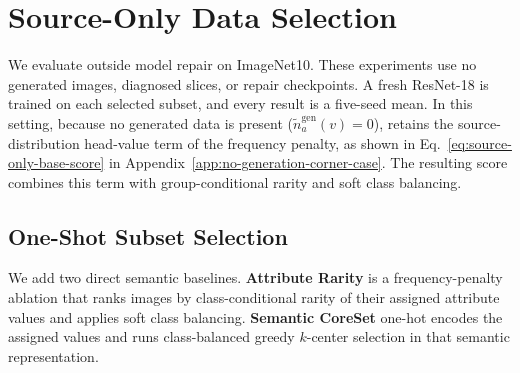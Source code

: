 \section{Source-Only Data Selection}
\label{app:source-only-selection}

We evaluate \model outside model repair on ImageNet10. These experiments use no generated images, diagnosed slices, or repair checkpoints. A fresh ResNet-18 is trained on each selected subset, and every result is a five-seed mean. In this setting, because no generated data is present ($\tilde{n}_a^{\mathrm{gen}}(v)=0$), \model retains the source-distribution head-value term of the frequency penalty, as shown in Eq.~\ref{eq:source-only-base-score} in Appendix~\ref{app:no-generation-corner-case}. The resulting score combines this term with group-conditional rarity and soft class balancing.

\subsection{One-Shot Subset Selection}

We add two direct semantic baselines. \textbf{Attribute Rarity} is a frequency-penalty ablation that ranks images by class-conditional rarity of their assigned attribute values and applies soft class balancing. \textbf{Semantic CoreSet} one-hot encodes the assigned values and runs class-balanced greedy $k$-center selection in that semantic representation.

\begin{table}[t]
\centering
\caption{ImageNet10 source-only one-shot data selection. Metric: five-seed mean test accuracy (\%).}
\label{tab:source-only-one-shot}
\small
\setlength{\tabcolsep}{3pt}
\end{table}

